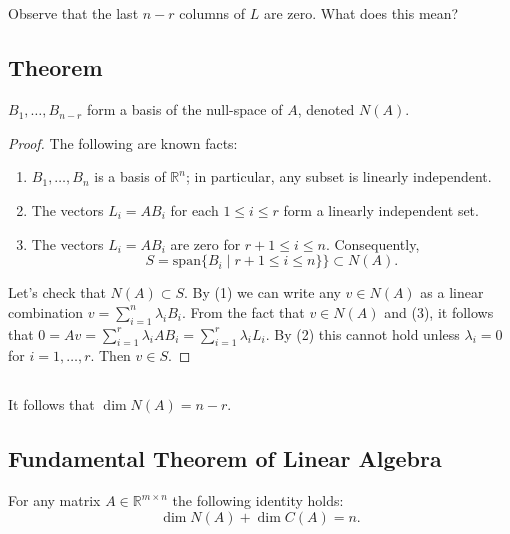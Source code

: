 \documentclass{proc-l}
\theoremstyle{definition}
\theoremstyle{remark}
\numberwithin{equation}{section}
\newcommand{\R}{\mathbb{R}}
\renewcommand{\span}[1]{\textrm{span}\{ {#1} \}}
\begin{document}
\subsection{}
Observe that the last $n - r$ columns of $L$ are zero. What does this mean?

\subsection{Theorem}
$B_1, \ldots, B_{n-r}$ form a basis of the null-space of $A$, denoted $N(A)$.
\begin{proof}
The following are known facts:
\begin{enumerate}
\item $B_1, \ldots, B_n$ is a basis of $\R^n$; in particular, any subset is linearly independent.
\item The vectors $L_i = AB_i$ for each $1\leq i\leq r$ form a linearly independent set.
\item The vectors $L_i=AB_i$ are zero for $r + 1\leq i\leq n$. Consequently, 
\[
S=\span{B_i\;|\; r + 1\leq i \leq n} \} \subset N(A).
\]
\end{enumerate}
Let's check that $N(A)\subset S$. By (1) we can write any $v\in N(A)$ as a linear combination $v=\sum_{i=1}^n\lambda_i B_i$. From the fact that $v\in N(A)$ and (3), it follows that $0 = Av = \sum_{i=1}^r \lambda_i AB_i = \sum_{i=1}^r \lambda_i L_i$. By (2) this cannot hold unless $\lambda_i = 0$ for $i=1,\ldots, r$. Then $v\in S$.
\end{proof}

\subsection{}
It follows that $\dim{N(A)} = n - r$.


\subsection{Fundamental Theorem of Linear Algebra}
For any matrix $A\in\R^{m\times n}$ the following identity holds:
\[
\dim{N(A)} + \dim{C(A)} = n.
\]



\end{document}
